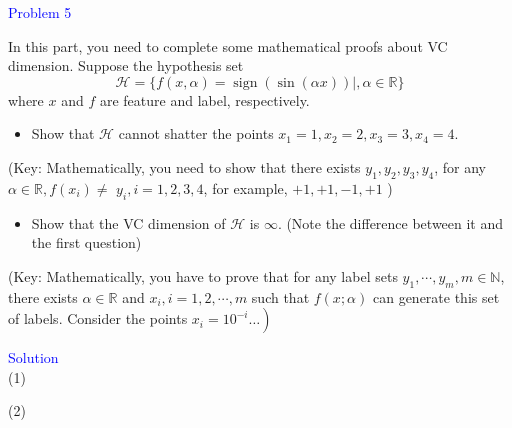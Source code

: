 \textcolor{blue}{Problem 5}

In this part, you need to complete some mathematical proofs about VC dimension. Suppose the hypothesis set
$$
\mathcal{H}=\{f(x, \alpha)=\operatorname{sign}(\sin (\alpha x)) \mid, \alpha \in \mathbb{R}\}
$$
where $x$ and $f$ are feature and label, respectively.
\begin{itemize}
    \item Show that $\mathcal{H}$ cannot shatter the points $x_1=1, x_2=2, x_3=3, x_4=4$.
\end{itemize}
(Key: Mathematically, you need to show that there exists $y_1, y_2, y_3, y_4$, for any $\alpha \in \mathbb{R}, f\left(x_i\right) \neq$ $y_i, i=1,2,3,4$, for example, $+1,+1,-1,+1$ )
\begin{itemize}
\item Show that the VC dimension of $\mathcal{H}$ is $\infty$. (Note the difference between it and the first question)
\end{itemize}
(Key: Mathematically, you have to prove that for any label sets $y_1, \cdots, y_m, m \in \mathbb{N}$, there exists $\alpha \in \mathbb{R}$ and $x_i, i=1,2, \cdots, m$ such that $f(x ; \alpha)$ can generate this set of labels. Consider the points $\left.x_i=10^{-i} \ldots\right)$

\textcolor{blue}{Solution}\\
(1) 











(2)






